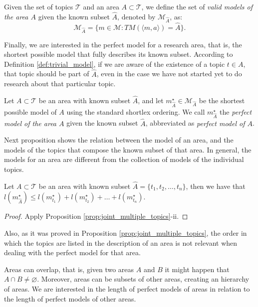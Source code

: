 \begin{definition}
Given the set of topics $\mathcal{T}$ and an area $A \subset \mathcal{T}$, we define the set of \emph{valid models of the area $A$} given the known subset $\hat{A}$, denoted by $\mathcal{M}_{\hat{A}}$, as:
\[
\mathcal{M}_{\hat{A}} = \{ m \in \mathcal{M} : TM \left(\langle m, a \rangle \right) = \hat{A} \}.
\]
\end{definition}

Finally, we are interested in the perfect model for a research area, that is, the shortest possible model that fully describes its known subset. According to Definition \ref{def:trivial_model}, if we are aware of the existence of a topic $t \in A$, that topic should be part of $\hat{A}$, even in the case we have not started yet to do research about that particular topic.

\begin{definition}
Let $A \subset \mathcal{T}$ be an area with known subset $\hat{A}$, and let $m_{\hat{A}}^{\star} \in \mathcal{M}_{\hat{A}}$ be the shortest possible model of $A$ using the standard shortlex ordering. We call  $m_{\hat{A}}^{\star}$ the \emph{perfect model of the area $A$} given the known subset $\hat{A}$, abbreviated as \emph{perfect model of $A$}.
\end{definition}

Next proposition shows the relation between the model of an area, and the models of the topics that compose the known subset of that area. In general, the models for an area are different from the collection of models of the individual topics.

\begin{proposition}
Let $A \subset \mathcal{T}$ be an area with known subset $\hat{A} = \{t_1, t_2, \ldots, t_n\}$, then we have that $l \left( m_{\hat{A}}^{\star} \right) \leq l(m_ {t_1}^\star) + l(m_ {t_2}^\star) + \ldots + l(m_ {t_n}^\star)$.
\end{proposition}
\begin{proof}
Apply Proposition \ref{prop:joint_multiple_topics}-ii. 
\end{proof}

Also, as it was proved in Proposition \ref{prop:joint_multiple_topics}, the order in which the topics are listed in the description of an area is not relevant when dealing with the perfect model for that area.

Areas can overlap, that is, given two areas $A$ and $B$ it might happen that $A \cap B \neq \varnothing$. Moreover, areas can be subsets of other areas, creating an hierarchy of areas. We are interested in the length of perfect models of areas in relation to the length of perfect models of other areas.

